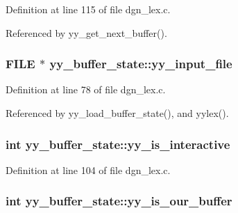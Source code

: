 Definition at line 115 of file dgn\+\_\+lex.\+c.



Referenced by yy\+\_\+get\+\_\+next\+\_\+buffer().

\hypertarget{structyy__buffer__state_a4360acfb226a1fc240ab2be17dd6beda}{
\subsubsection[{yy\+\_\+input\+\_\+file}]{\setlength{\rightskip}{0pt plus 5cm}F\+I\+L\+E $\ast$ yy\+\_\+buffer\+\_\+state\+::yy\+\_\+input\+\_\+file}}\label{structyy__buffer__state_a4360acfb226a1fc240ab2be17dd6beda}


Definition at line 78 of file dgn\+\_\+lex.\+c.



Referenced by yy\+\_\+load\+\_\+buffer\+\_\+state(), and yylex().

\hypertarget{structyy__buffer__state_abf5c70eea75581b58c0ee7bd31b14490}{
\subsubsection[{yy\+\_\+is\+\_\+interactive}]{\setlength{\rightskip}{0pt plus 5cm}int yy\+\_\+buffer\+\_\+state\+::yy\+\_\+is\+\_\+interactive}}\label{structyy__buffer__state_abf5c70eea75581b58c0ee7bd31b14490}


Definition at line 104 of file dgn\+\_\+lex.\+c.

\hypertarget{structyy__buffer__state_a80ce2431c70dc4f89ced487f18449465}{
\subsubsection[{yy\+\_\+is\+\_\+our\+\_\+buffer}]{\setlength{\rightskip}{0pt plus 5cm}int yy\+\_\+buffer\+\_\+state\+::yy\+\_\+is\+\_\+our\+\_\+buffer}}\label{structyy__buffer__state_a80ce2431c70dc4f89ced487f18449465}


